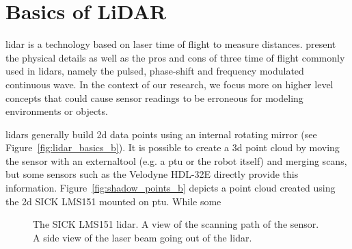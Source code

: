 \section{Basics of LiDAR}
\label{sec:chap_lidar_basics}

\gls{lidar} is a technology based on laser time of flight to measure distances. \citet{lidar_basics} present the physical details as well as the pros and cons of three time of flight commonly used in \gls{lidar}s, namely the pulsed, phase-shift and frequency modulated continuous wave. In the context of our research, we focus more on higher level concepts that could cause sensor readings to be erroneous for modeling environments or objects. 

\gls{lidar}s generally build \gls{2d} data points using an internal rotating mirror (see Figure~\ref{fig:lidar_basics_b}). It is possible to create a \gls{3d} point cloud by moving the sensor with an externaltool (e.g. a \gls{ptu} or the robot itself) and merging scans, but some sensors such as the Velodyne HDL-32E directly provide this information. Figure~\ref{fig:shadow_points_b} depicts a point cloud created using the \gls{2d} SICK LMS151 mounted on \gls{ptu}. While some

\begin{figure}[h]
    \centering
    \caption{\protect{} The SICK LMS151 \gls{lidar}. \protect{} A view of the scanning path of the sensor. \protect{} A side view of the laser beam going out of the \gls{lidar}.}
    \label{fig:lidar_basics}
\end{figure}

